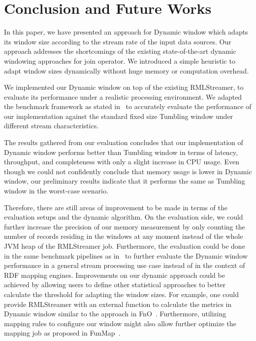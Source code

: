 \chapter{Conclusion and Future Works}%
\label{chap:Conclusion and Future Works}


In this paper, we have presented an approach for Dynamic window 
which adapts its window size according to the stream rate of the 
input data sources. Our approach addresses the shortcomings of 
the existing state-of-the-art dynamic windowing approaches for 
join operator. We introduced a simple heuristic to adapt 
window sizes dynamically without huge memory or computation overhead. 

We implemented our Dynamic window on top of the existing RMLStreamer, 
to evaluate its performance under a realistic processing environment. 
We adapted the benchmark framework as stated in~\cite{evalution_of_spe} to 
accurately evaluate the performance of our implementation against the 
standard fixed size Tumbling window under different stream characteristics. 

The results gathered from our evaluation concludes that our implementation 
of Dynamic window performs better than Tumbling window in terms of 
latency, throughput, and completeness with only a slight 
increase in CPU usage. Even though we could not confidently conclude that
memory usage is lower in Dynamic window, our preliminary results indicate 
that it performs the same as Tumbling window in the worst-case scenario.

Therefore, there are still areas of improvement to be made in terms of the
evaluation setups
and the dynamic algorithm. On the evaluation side, we could further increase 
the precision of our memory measurement by only counting the number of records
residing in the windows at any moment instead of the whole JVM heap of the RMLStreamer job. 
Furthermore, the evaluation could be done in the same benchmark pipelines as in~\cite{evalution_of_spe} 
to further evaluate the Dynamic window performance in a general stream processing use case instead 
of in the context of RDF mapping engines.  
Improvements on our dynamic approach could be achieved by allowing users to 
define other statistical approaches
to better calculate the threshold for adapting the window sizes. For example, one could provide 
RMLStreamer with an external function to calculate the metrics in Dynamic window similar to the approach 
in FnO~\cite{fno_ben}. Furthermore, utilizing mapping rules to configure our window might also allow further
optimize the mapping job as proposed in FunMap~\cite{funmap}. 


